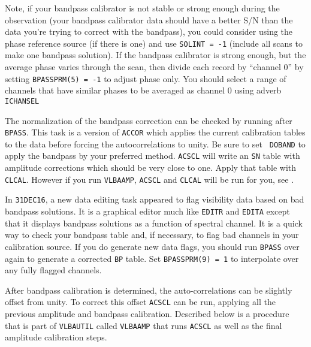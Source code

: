 Note, if your bandpass calibrator is not stable or strong enough
during the observation (your bandpass calibrator data should have
a better S/N than the data you're trying to correct with the
bandpass), you could consider using the phase reference source (if
there is one) and use {\tt SOLINT = -1} (include all scans to make one
bandpass solution).  If the bandpass calibrator is strong enough, but
the average phase varies through the scan, then divide each record by
``channel 0'' by setting {\tt BPASSPRM(5) = -1} to adjust phase only.
You should select a range of channels that have similar phases to be
averaged as channel 0 using adverb {\tt ICHANSEL}\@

The normalization of the bandpass correction can be checked by running
{\tt {}} after {\tt BPASS}\@.  This task is a version of
{\tt ACCOR} which applies the current calibration tables to the data
before forcing the autocorrelations to unity.  Be sure to set {\tt
DOBAND} to apply the bandpass by your preferred method.  {\tt ACSCL}
will write an {\tt SN} table with amplitude corrections which should
be very close to one.  Apply that table with {\tt CLCAL}\@.  However
if you run {\tt VLBAAMP}, {\tt ACSCL} and {\tt CLCAL} will be run
for you, see \@.

In {\tt 31DEC16}, a new data editing task {\tt {}} appeared
to flag visibility data based on bad bandpass solutions.  It is a
graphical editor much like {\tt EDITR} and {\tt EDITA} except that it
displays bandpass solutions as a function of spectral channel.  It is
a quick way to check your bandpass table and, if necessary, to flag
bad channels in your calibration source.  If you do generate new data
flags, you should run {\tt BPASS} over again to generate a corrected
{\tt BP} table.  Set {\tt BPASSPRM(9) = 1} to interpolate over any
fully flagged channels.



After bandpass calibration is determined, the auto-correlations can be
slightly offset from unity.  To correct this offset {\tt ACSCL} can be run,
applying all the previous amplitude and bandpass calibration.  Described
below is a procedure that is part of {\tt VLBAUTIL} called {\tt VLBAAMP}
that runs {\tt ACSCL} as well as the final amplitude calibration steps.

